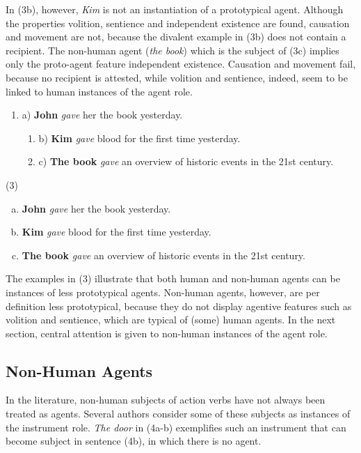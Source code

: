 \documentclass[output=paper]{LSP/langsci}
\begin{document}
In (3b), however, \textit{Kim} is not an instantiation of a prototypical agent. Although the properties volition, sentience and independent existence are found, causation and movement are not, because the divalent example in (3b) does not contain a recipient. The non-human agent (\textit{the book}) which is the subject of (3c) implies only the proto-agent feature independent existence. Causation and movement fail, because no recipient is attested, while volition and sentience, indeed, seem to be linked to human instances of the agent role.\newline 


\begin{enumerate}[(3)]
\item a) \textbf{John} \textit{gave} her the book yesterday.
      \begin{enumerate}[]
\item b) \textbf{Kim} \textit{gave} blood for the first time yesterday. 
\item c) \textbf{The book} \textit{gave} an overview of historic events in the 21st century.
      \end{enumerate}
\end{enumerate}

\noindent(3)
\begin{enumerate}[a)]
\item \textbf{John} \textit{gave} her the book yesterday. 
\item \textbf{Kim} \textit{gave} blood for the first time yesterday. 
\item \textbf{The book} \textit{gave} an overview of historic events in the 21st century.
\end{enumerate}

The examples in (3) illustrate that both human and non-human agents can be instances of less prototypical agents. Non-human agents, however, are per definition less prototypical, because they do not display agentive features such as volition and sentience, which are typical of (some) human agents. In the next section, central attention is given to non-human instances of the agent role.

\subsection{Non-Human Agents} 

In the literature, non-human subjects of action verbs have not always been treated as agents. Several authors \citep[see e.g.][]{Fillmore1968,Quirk1972,Levin1993} consider some of these subjects as instances of the instrument role. \textit{The door} in (4a-b) exemplifies such an instrument that can become subject in sentence (4b), in which there is no agent.\newline      
\end{document}
